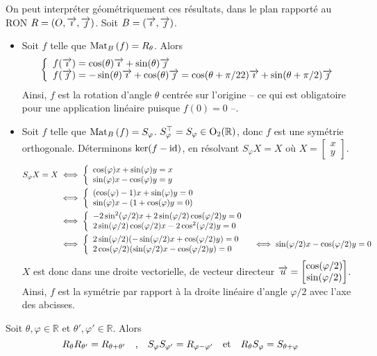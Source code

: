     On peut interpréter géométriquement ces résultats, dans le plan rapporté au RON $R = (O, \overrightarrow{\imath}, \overrightarrow{\jmath})$. Soit $B = (\overrightarrow{\imath}, \overrightarrow{\jmath})$.
    \begin{itemize}
        \item Soit $f$ telle que $\text{Mat}_{B}\left(f\right) = R_{\theta}$. Alors 
        \[ \et{f(\vct{\imath}) = \cos(\theta) \vct{\imath} + \sin(\theta) \vct{\jmath}}{f(\vct{\jmath}) = -\sin(\theta) \vct{\imath} + \cos(\theta) \vct{\jmath} = \cos(\theta + \pi /2 2) \vct{\imath} + \sin(\theta + \pi / 2) \vct{\jmath} } \]   
        Ainsi, $f$ est la rotation d’angle $\theta$ centrée sur l’origine -- ce qui est obligatoire pour une application linéaire puisque $f(0) = 0$ --.
        \item Soit $f$ telle que $\text{Mat}_{B}\left(f\right) = S_{\varphi}$. $S_{\varphi}^{\top} = S_{\varphi} \in \operatorname{O}_2(\mathbb{R})$, donc $f$ est une symétrie orthogonale. Déterminons $\ker(f - \operatorname{id})$, en résolvant $S_{\varphi} X = X$ où $X = \begin{bmatrix}
            x \\
            y
        \end{bmatrix}$. 
        \begin{align*}
            S_{\varphi} X = X 
            &\iff \et{\cos(\varphi) x + \sin(\varphi) y = x}{\sin(\varphi) x - \cos(\varphi) y = y} \\
            &\iff \et{(\cos(\varphi)-1)x + \sin(\varphi)y = 0}{\sin(\varphi)x - (1 + \cos(\varphi)y = 0)} \\
            &\iff \et{-2 \sin^2(\varphi / 2) x + 2 \sin(\varphi/2) \cos(\varphi/2) y = 0}{2 \sin(\varphi / 2)\cos(\varphi / 2)x - 2 \cos^2(\varphi/ 2)y = 0} \\
            &\iff \et{2 \sin(\varphi/2)(-\sin(\varphi/2)x + \cos(\varphi/2)y)  = 0}{2 \cos(\varphi/2)(\sin(\varphi/2)x - \cos(\varphi/2)y) = 0}
            &\iff \sin(\varphi/2)x - \cos(\varphi/2)y = 0
        \end{align*}
        $X$ est donc dans une droite vectorielle, de vecteur directeur $\overrightarrow{u} = \begin{bmatrix}
            \cos(\varphi/2) \\
            \sin(\varphi/2)
        \end{bmatrix}$. Ainsi, $f$ est la symétrie par rapport à la droite linéaire d’angle $\varphi / 2$ avec l’axe des abcisses.
    \end{itemize}

    \begin{prop}{}{}
        Soit $\theta, \varphi \in \mathbb{R}$ et $\theta', \varphi' \in \mathbb{R}$. Alors 
        \[ R_{\theta}R_{\theta'} = R_{\theta + \theta'} \quad \text{,} \quad S_{\varphi} S_{\varphi'} = R_{\varphi - \varphi'} \quad \text{et} \quad R_{\theta} S_{\varphi} = S_{\theta + \varphi} \]
    \end{prop}
    
